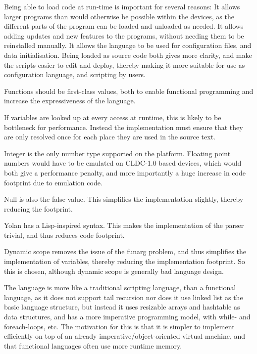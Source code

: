 \documentclass[11pt]{report}
\begin{document}
Being able to load code at run-time is important for several reasons:
It allows larger programs than would otherwise be possible within the devices, as the different parts of the program can be loaded and unloaded as needed.
It allows adding updates and new features to the programs, without needing them to be reinstalled manually.
It allows the language to be used for configuration files, and data initialisation.
Being loaded as source code both gives more clarity, and make the scripts easier to edit and deploy, thereby making it more suitable for use as configuration language, and scripting by users.

Functions should be first-class values, both to enable functional programming and increase the expressiveness of the language.


If variables are looked up at every access at runtime, this is likely to be bottleneck for performance.  %
Instead the implementation must ensure that they are only resolved once for each place they are used in the source text.

Integer is the only number type supported on the platform. Floating point numbers would have to be emulated on CLDC-1.0 based devices, which would both give a performance penalty, and more importantly a huge increase in code footprint due to emulation code.

Null is also the false value. This simplifies the implementation slightly, thereby reducing the footprint.

Yolan has a Lisp-inspired syntax. This makes the implementation of the parser trivial, and thus reduces code footprint.

Dynamic scope removes the issue of the funarg problem, and thus simplifies the implementation of variables, thereby reducing the implementation footprint. So this is chosen, although dynamic scope is generally bad language design.

The language is more like a traditional scripting language, than a functional language, 
as it does not support tail recursion nor does it use linked list as the basic language structure, but instead it uses resizable arrays and hashtable as data structures, and has a more imperative programming model, with while- and foreach-loops, etc.
The motivation for this is that it is simpler to implement efficiently on top of an already imperative/object-oriented virtual machine, and that functional languages often use more runtime memory.
\end{document}

